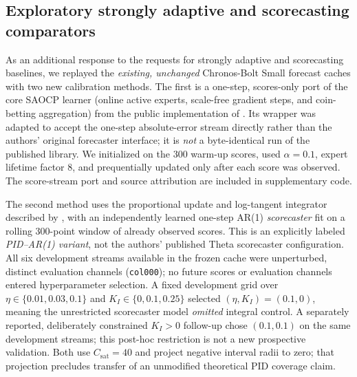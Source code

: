 \documentclass[10pt]{article}
\begin{document}
\subsection{Exploratory strongly adaptive and scorecasting comparators}
\label{sec:chronos_new_comp}

As an additional response to the requests for strongly adaptive and
scorecasting baselines, we replayed the \emph{existing, unchanged}
Chronos-Bolt Small forecast caches with two new calibration methods.
The first is a one-step, scores-only port of the core SAOCP learner
(online active experts, scale-free gradient steps, and coin-betting
aggregation) from the public implementation of
\citet{bhatnagar2023improved}. Its wrapper was adapted to accept the
one-step absolute-error stream directly rather than the authors' original
forecaster interface; it is \emph{not} a byte-identical run of the
published library. We initialized on the 300 warm-up scores, used
$\alpha=0.1$, expert lifetime factor 8, and prequentially updated
only after each score was observed. The score-stream port and source
attribution are included in supplementary code.

The second method uses the proportional update and log-tangent
integrator described by \citet{angelopoulos2023conformal}, with an
independently learned one-step AR(1) \emph{scorecaster} fit on a rolling
300-point window of already observed scores. This is an explicitly
labeled \emph{PID--AR(1) variant}, not the authors' published Theta
scorecaster configuration. All six development streams available in the
frozen cache were unperturbed, distinct evaluation channels
(\texttt{col000}); no future scores or evaluation channels entered
hyperparameter selection. A fixed development grid over
$\eta\in\{0.01,0.03,0.1\}$ and
$K_I\in\{0,0.1,0.25\}$ selected $(\eta,K_I)=(0.1,0)$,
meaning the unrestricted scorecaster model \emph{omitted} integral
control. A separately reported, deliberately constrained $K_I>0$
follow-up chose $(0.1,0.1)$ on the same development streams; this
post-hoc restriction is not a new prospective validation. Both use
$C_{\mathrm{sat}}=40$ and project negative interval radii to zero;
that projection precludes transfer of an unmodified theoretical PID
coverage claim.
\end{document}
